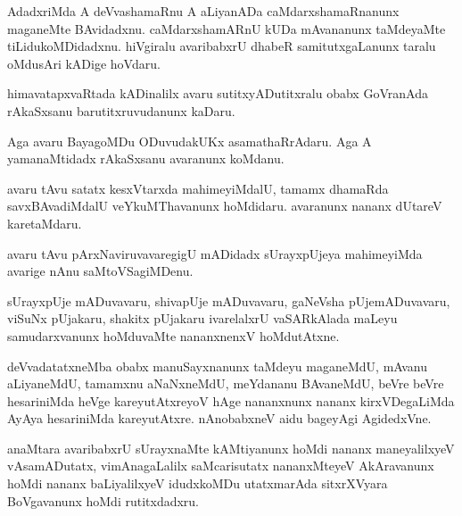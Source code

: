 \documentclass{article}
\begin{document}
\begin{mn}%
AdadxriMda A deVvashamaRnu A aLiyanADa caMdarxshamaRnanunx maganeMte BAvidadxnu. caMdarxshamARnU 
kUDa mAvananunx taMdeyaMte tiLidukoMDidadxnu. hiVgiralu avaribabxrU dhabeR samitutxgaLanunx taralu 
oMdusAri kADige hoVdaru.
\end{mn}

\begin{mn}%
himavatapxvaRtada kADinalilx avaru sutitxyADutitxralu obabx GoVranAda rAkaSxsanu barutitxruvudanunx 
kaDaru.
\end{mn}

\begin{mn}%
Aga avaru BayagoMDu ODuvudakUKx asamathaRrAdaru. Aga A yamanaMtidadx rAkaSxsanu avaranunx koMdanu.
\end{mn}

\begin{mn}%
avaru tAvu satatx kesxVtarxda mahimeyiMdalU, tamamx dhamaRda savxBAvadiMdalU veYkuMThavanunx 
hoMdidaru. avaranunx nananx dUtareV karetaMdaru.
\end{mn}

\begin{mn}%
avaru tAvu pArxNaviruvavaregigU mADidadx sUrayxpUjeya mahimeyiMda avarige nAnu saMtoVSagiMDenu.
\end{mn}

\begin{mn}%
sUrayxpUje mADuvavaru, shivapUje mADuvavaru, gaNeVsha pUjemADuvavaru, viSuNx pUjakaru, shakitx 
pUjakaru ivarelalxrU vaSARkAlada maLeyu samudarxvanunx hoMduvaMte nananxnenxV hoMdutAtxne.
\end{mn}

\begin{mn}%
deVvadatatxneMba obabx manuSayxnanunx taMdeyu maganeMdU, mAvanu aLiyaneMdU, tamamxnu aNaNxneMdU, 
meYdananu BAvaneMdU, beVre beVre hesariniMda heVge kareyutAtxreyoV hAge nananxnunx nananx 
kirxVDegaLiMda AyAya hesariniMda kareyutAtxre. nAnobabxneV aidu bageyAgi AgidedxVne.
\end{mn}

\begin{mn}%
anaMtara avaribabxrU sUrayxnaMte kAMtiyanunx hoMdi nananx maneyalilxyeV vAsamADutatx, 
vimAnagaLalilx saMcarisutatx nananxMteyeV AkAravanunx hoMdi nananx baLiyalilxyeV idudxkoMDu 
utatxmarAda sitxrXVyara BoVgavanunx hoMdi rutitxdadxru.
\end{mn}

\end{document}
